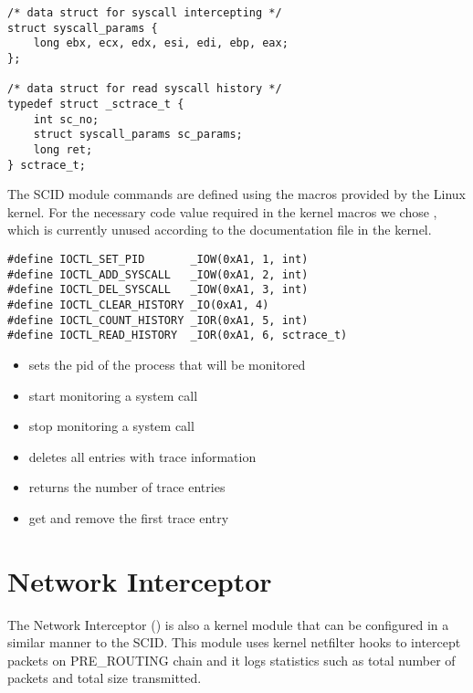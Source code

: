 \lstset{language=C,caption=SCID data structures,label=lst:scid-struct}
\begin{lstlisting}
/* data struct for syscall intercepting */
struct syscall_params {
	long ebx, ecx, edx, esi, edi, ebp, eax;
};

/* data struct for read syscall history */
typedef struct _sctrace_t {
	int sc_no;
	struct syscall_params sc_params;
	long ret;
} sctrace_t;
\end{lstlisting}

The SCID module  commands are defined using the macros provided by the Linux kernel. For the necessary code value required in the kernel macros we chose , which is currently unused according to the documentation file in the kernel.

\lstset{language=C,caption=Command macros for ioctl,label=lst:scid-ioctl}
\begin{lstlisting}
#define IOCTL_SET_PID		_IOW(0xA1, 1, int)
#define IOCTL_ADD_SYSCALL	_IOW(0xA1, 2, int)
#define IOCTL_DEL_SYSCALL	_IOW(0xA1, 3, int)
#define IOCTL_CLEAR_HISTORY	_IO(0xA1, 4)
#define IOCTL_COUNT_HISTORY	_IOR(0xA1, 5, int)
#define IOCTL_READ_HISTORY	_IOR(0xA1, 6, sctrace_t)
\end{lstlisting}

\begin{itemize}
	\item {} sets the pid of the process that will be monitored
	\item {} start monitoring a system call
	\item {} stop monitoring a system call
	\item {} deletes all entries with trace information
	\item {} returns the number of trace entries
	\item {} get and remove the first trace entry
\end{itemize}

\section{Network Interceptor}
\label{fourth:ni}

The Network Interceptor () is also a kernel module that can be configured in a similar manner to the SCID. This module uses kernel netfilter hooks to intercept packets on PRE_ROUTING chain and it logs statistics such as total number of packets and total size transmitted.

